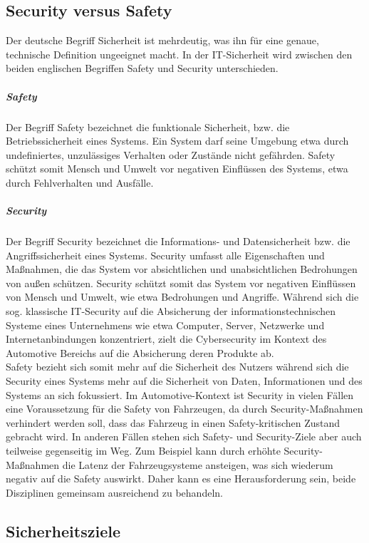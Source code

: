 \subsection{Security versus Safety}
Der deutsche Begriff \glqq Sicherheit\grqq{} ist mehrdeutig, was ihn für eine genaue, technische Definition ungeeignet macht. In der IT-Sicherheit wird zwischen den beiden englischen Begriffen \glqq Safety\grqq{} und \glqq Security\grqq{} unterschieden.
\subparagraph{Safety}
\glqq Der Begriff Safety bezeichnet die funktionale Sicherheit, bzw. die Betriebssicherheit eines Systems. Ein System darf seine Umgebung etwa durch undefiniertes, unzulässiges Verhalten oder Zustände nicht gefährden. Safety schützt somit Mensch und Umwelt vor negativen Einflüssen des Systems, etwa durch Fehlverhalten und Ausfälle.\grqq{} \cite[2]{Wurm.2022}
\subparagraph{Security}
\glqq Der Begriff Security bezeichnet die Informations- und Datensicherheit bzw. die Angriffssicherheit eines Systems. Security umfasst alle Eigenschaften und Maßnahmen, die das System vor absichtlichen und unabsichtlichen Bedrohungen
von außen schützen. Security schützt somit das System vor negativen Einflüssen von Mensch und Umwelt, wie etwa Bedrohungen und Angriffe. Während sich die sog. klassische IT-Security auf die Absicherung der informationstechnischen Systeme eines Unternehmens wie etwa Computer, Server, Netzwerke und Internetanbindungen konzentriert, zielt die Cybersecurity im Kontext des Automotive Bereichs auf die Absicherung deren Produkte ab.\grqq{} \cite[2\psq]{Wurm.2022}\\

Safety bezieht sich somit mehr auf die Sicherheit des Nutzers während sich die Security eines Systems mehr auf die Sicherheit von Daten, Informationen und des Systems an sich fokussiert. Im Automotive-Kontext ist Security in vielen Fällen eine Voraussetzung für die Safety von Fahrzeugen, da durch Security-Maßnahmen verhindert werden soll, dass das Fahrzeug in einen Safety-kritischen Zustand gebracht wird. In anderen Fällen stehen sich Safety- und Security-Ziele aber auch teilweise gegenseitig im Weg. Zum Beispiel kann durch erhöhte Security-Maßnahmen die Latenz der Fahrzeugsysteme ansteigen, was sich wiederum negativ auf die Safety auswirkt. Daher kann es eine Herausforderung sein, beide Disziplinen gemeinsam ausreichend zu behandeln.



\subsection{Sicherheitsziele}


